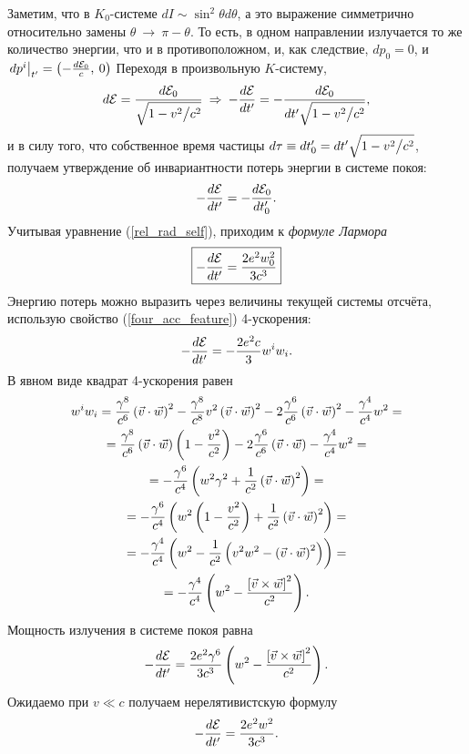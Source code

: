     Заметим, что в $K_0$-системе $dI \sim \sin^2\theta d\theta$, а это выражение симметрично относительно замены $\theta \:\rightarrow\: \pi - \theta$.
    То есть, в одном направлении излучается то же количество энергии, что и в противоположном, и, как следствие, $dp_0 = 0$, и
    $\left. dp^i \right|_{t'} = \left({-\frac{d\mathcal{E}_0}{c}, \:0}\right)$ Переходя в произвольную $K$-систему,
    \begin{equation*}
        d\mathcal{E} = \frac{d\mathcal{E}_0}{\sqrt{1 - v^2 \big/ c^2}} \:\Rightarrow\: -\frac{d\mathcal{E}}{dt'} = -\frac{d\mathcal{E}_0}{dt'\sqrt{1 - v^2 \big/ c^2}},
    \end{equation*}
    и в силу того, что собственное время частицы $d\tau \equiv dt'_0 = dt'\sqrt{1 - v^2 \big/ c^2}$, получаем утверждение об инвариантности потерь энергии в системе покоя:
    \[
        -\frac{d\mathcal{E}}{dt'} = -\frac{d\mathcal{E}_0}{dt_0'}.
    \]
    Учитывая уравнение (\ref{rel_rad_self}), приходим к \textit{формуле Лармора}
    \begin{equation*}
        \boxed{-\frac{d\mathcal{E}}{dt'} = \frac{2e^2w_0^2}{3c^3}}
    \end{equation*}
    Энергию потерь можно выразить через величины текущей системы отсчёта, использую свойство (\ref{four_acc_feature}) 4-ускорения:
    \begin{equation*}
        -\frac{d\mathcal{E}}{dt'} = -\frac{2e^2c}{3}w^iw_i.
    \end{equation*}
    В явном виде квадрат 4-ускорения равен
    \begin{gather*}
        w^iw_i = \frac{\gamma^8}{c^6}\left({\vec{v}\cdot\vec{w}}\right)^2 - \frac{\gamma^8}{c^8}v^2\left({\vec{v}\cdot\vec{w}}\right)^2 - 2\frac{\gamma^6}{c^6} \left({\vec{v}\cdot\vec{w}}\right)^2 - \frac{\gamma^4}{c^4}w^2 = \\ =
        \frac{\gamma^8}{c^6}\left({\vec{v}\cdot\vec{w}}\right)\left({1 - \frac{v^2}{c^2}}\right) - 2\frac{\gamma^6}{c^6}\left({\vec{v}\cdot\vec{w}}\right)  - \frac{\gamma^4}{c^4}w^2 = \\ =
        -\frac{\gamma^6}{c^4}\left({w^2\gamma^2 + \frac{1}{c^2}\left({\vec{v}\cdot\vec{w}}\right)^2}\right) = \\ =
        -\frac{\gamma^6}{c^4}\left({w^2\left({1 - \frac{v^2}{c^2}}\right) + \frac{1}{c^2}\left({\vec{v}\cdot\vec{w}}\right)^2}\right) = \\ =
        -\frac{\gamma^4}{c^4}\left({w^2 - \frac{1}{c^2}\left({v^2w^2 - \left({\vec{v}\cdot\vec{w}}\right)^2}\right)}\right) = \\ =
        -\frac{\gamma^4}{c^4}\left({w^2 - \frac{\left[{\vec{v}\times\vec{w}}\right]^2}{c^2}}\right).
    \end{gather*}
    Мощность излучения в системе покоя равна
    \begin{equation*}
        -\frac{d\mathcal{E}}{dt'} = \frac{2e^2\gamma^6}{3c^3}\left({w^2 - \frac{\left[{\vec{v}\times\vec{w}}\right]^2}{c^2}}\right).
    \end{equation*}
    Ожидаемо при $v \ll c$ получаем нерелятивистскую формулу
    \[
        -\frac{d\mathcal{E}}{dt'} = \frac{2e^2w^2}{3c^3}.
    \]

